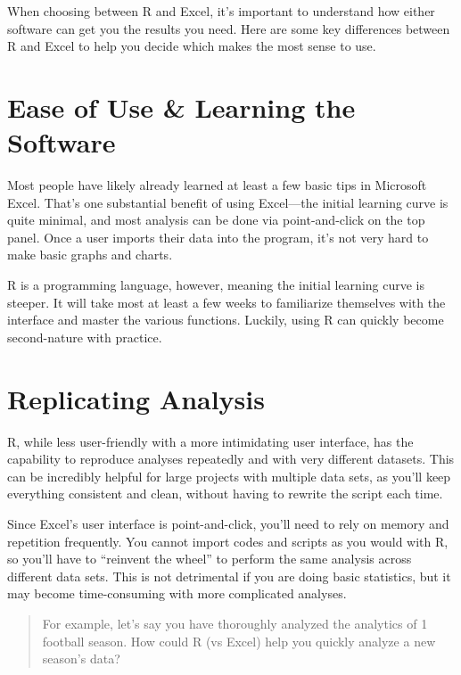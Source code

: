 \documentclass[
]{book}
\begin{document}
When choosing between R and Excel, it's important to understand how either software can get you the results you need. Here are some key differences between R and Excel to help you decide which makes the most sense to use.

\hypertarget{ease-of-use-learning-the-software}{%
\section{Ease of Use \& Learning the Software}\label{ease-of-use-learning-the-software}}

Most people have likely already learned at least a few basic tips in Microsoft Excel. That's one substantial benefit of using Excel---the initial learning curve is quite minimal, and most analysis can be done via point-and-click on the top panel. Once a user imports their data into the program, it's not very hard to make basic graphs and charts.

R is a programming language, however, meaning the initial learning curve is steeper. It will take most at least a few weeks to familiarize themselves with the interface and master the various functions. Luckily, using R can quickly become second-nature with practice.

\hypertarget{replicating-analysis}{%
\section{Replicating Analysis}\label{replicating-analysis}}

R, while less user-friendly with a more intimidating user interface, has the capability to reproduce analyses repeatedly and with very different datasets. This can be incredibly helpful for large projects with multiple data sets, as you'll keep everything consistent and clean, without having to rewrite the script each time.

Since Excel's user interface is point-and-click, you'll need to rely on memory and repetition frequently. You cannot import codes and scripts as you would with R, so you'll have to ``reinvent the wheel'' to perform the same analysis across different data sets. This is not detrimental if you are doing basic statistics, but it may become time-consuming with more complicated analyses.

\begin{quote}
For example, let's say you have thoroughly analyzed the analytics of 1 football season. How could R (vs Excel) help you quickly analyze a new season's data?
\end{quote}
\end{document}
